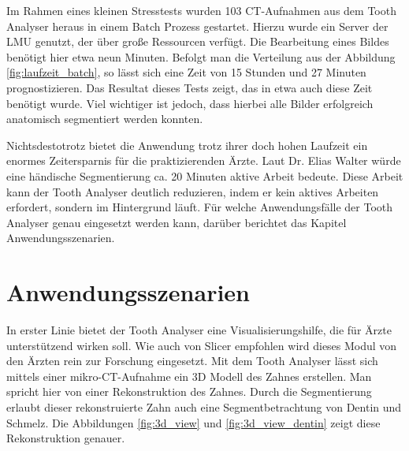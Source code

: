 Im Rahmen eines kleinen Stresstests wurden 103 \ac{CT}-Aufnahmen aus dem Tooth
Analyser heraus in einem Batch Prozess gestartet. Hierzu wurde ein Server der \ac{LMU}
genutzt, der über große Ressourcen verfügt. Die Bearbeitung eines Bildes
benötigt hier etwa neun Minuten. Befolgt man die Verteilung aus der Abbildung \ref{fig:laufzeit_batch},
so lässt sich eine Zeit von 15 Stunden und 27 Minuten prognostizieren. Das Resultat
dieses Tests zeigt, das in etwa auch diese Zeit benötigt wurde. Viel wichtiger ist
jedoch, dass hierbei alle Bilder erfolgreich anatomisch segmentiert werden
konnten.

Nichtsdestotrotz bietet die Anwendung trotz ihrer doch hohen Laufzeit ein
enormes Zeitersparnis für die praktizierenden Ärzte. Laut Dr. Elias Walter würde
eine händische Segmentierung ca. 20 Minuten aktive Arbeit bedeute. Diese Arbeit
kann der Tooth Analyser deutlich reduzieren, indem er kein aktives Arbeiten erfordert,
sondern im Hintergrund läuft. Für welche Anwendungsfälle der Tooth Analyser genau
eingesetzt werden kann, darüber berichtet das Kapitel Anwendungsszenarien.

\section{Anwendungsszenarien}
In erster Linie bietet der Tooth Analyser eine Visualisierungshilfe, die für Ärzte
unterstützend wirken soll. Wie auch von Slicer empfohlen wird dieses Modul von
den Ärzten rein zur Forschung eingesetzt. Mit dem Tooth Analyser lässt sich mittels
einer mikro-\ac{CT}-Aufnahme ein 3D Modell des Zahnes erstellen. Man spricht hier
von einer Rekonstruktion des Zahnes. Durch die Segmentierung erlaubt dieser
rekonstruierte Zahn auch eine Segmentbetrachtung von Dentin und Schmelz. Die Abbildungen
\ref{fig:3d_view} und \ref{fig:3d_view_dentin} zeigt diese Rekonstruktion genauer.

